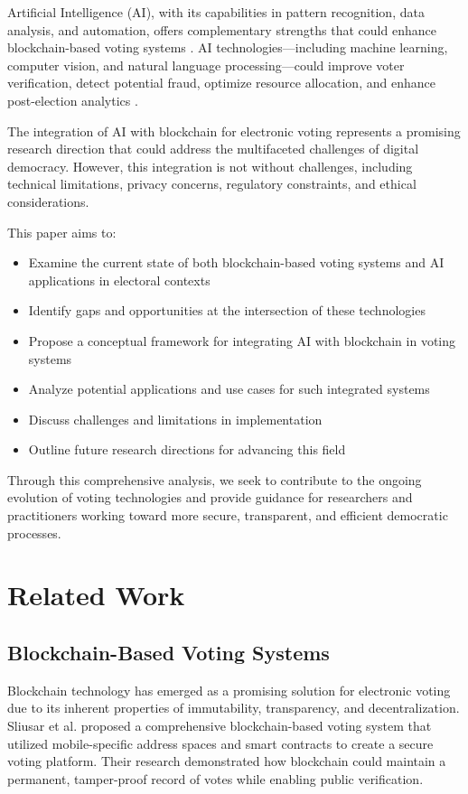\documentclass[conference]{IEEEtran}
\begin{document}
Artificial Intelligence (AI), with its capabilities in pattern recognition, data analysis, and automation, offers complementary strengths that could enhance blockchain-based voting systems \cite{b4}. AI technologies—including machine learning, computer vision, and natural language processing—could improve voter verification, detect potential fraud, optimize resource allocation, and enhance post-election analytics \cite{b5}.

The integration of AI with blockchain for electronic voting represents a promising research direction that could address the multifaceted challenges of digital democracy. However, this integration is not without challenges, including technical limitations, privacy concerns, regulatory constraints, and ethical considerations.

This paper aims to:
\begin{itemize}
    \item Examine the current state of both blockchain-based voting systems and AI applications in electoral contexts
    \item Identify gaps and opportunities at the intersection of these technologies
    \item Propose a conceptual framework for integrating AI with blockchain in voting systems
    \item Analyze potential applications and use cases for such integrated systems
    \item Discuss challenges and limitations in implementation
    \item Outline future research directions for advancing this field
\end{itemize}

Through this comprehensive analysis, we seek to contribute to the ongoing evolution of voting technologies and provide guidance for researchers and practitioners working toward more secure, transparent, and efficient democratic processes.

\section{Related Work}
\subsection{Blockchain-Based Voting Systems}
Blockchain technology has emerged as a promising solution for electronic voting due to its inherent properties of immutability, transparency, and decentralization. Sliusar et al. \cite{b6} proposed a comprehensive blockchain-based voting system that utilized mobile-specific address spaces and smart contracts to create a secure voting platform. Their research demonstrated how blockchain could maintain a permanent, tamper-proof record of votes while enabling public verification.
\end{document}
